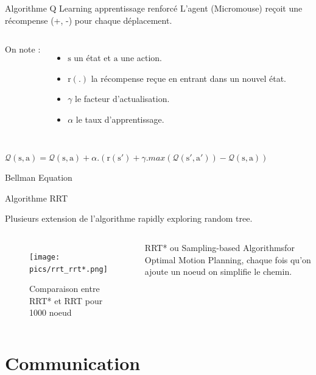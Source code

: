 \documentclass{beamer}
\begin{document}
\begin{frame}{Algorithme Q Learning apprentissage renforcé}
L'agent (Micromouse) reçoit une récompense (+, -) pour chaque déplacement.

\begin{columns}[c]


On note :
\begin{itemize}
    \item $\mathrm{s}$ un état et $\mathrm{a}$ une action.
    \item $\mathrm{r(.)}$ la récompense reçue en entrant dans un nouvel état.
    \item $\gamma$ le facteur d'actualisation.
    \item $\alpha$ le taux d'apprentissage.
\end{itemize}

\end{columns}

\begin{center}
\large{
$\mathcal{Q}(\mathrm{s},\mathrm{a}) = \mathcal{Q}(\mathrm{s},\mathrm{a}) + \alpha . (\mathrm{r}(\mathrm{s'}) + \gamma . max(\mathcal{Q}(\mathrm{s'},\mathrm{a'})) - \mathcal{Q}(\mathrm{s},\mathrm{a}))$}

\color{red}
Bellman Equation
\end{center}

\end{frame}

\begin{frame}{Algorithme RRT}

Plusieurs extension de l'algorithme rapidly exploring random tree.
\begin{columns}[c]

\begin{figure}
    \centering
    \texttt{[image: pics/rrt\_rrt*.png]}
    \caption{Comparaison entre RRT* et RRT pour 1000 noeud}
\end{figure}

RRT* ou Sampling-based Algorithmsfor Optimal Motion Planning, chaque fois qu'on ajoute un noeud on simplifie le chemin.
\end{columns}
\end{frame}


\section{Communication}
\end{document}
